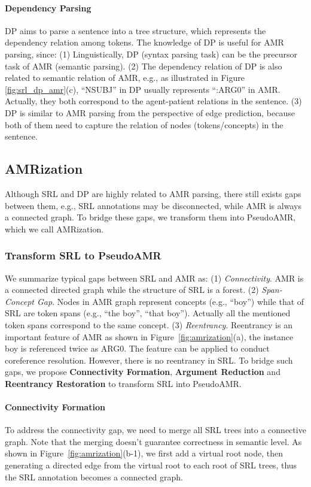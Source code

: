 \documentclass[11pt]{article}
\begin{document}
\paragraph{Dependency Parsing} DP aims to parse a sentence into a tree structure, which represents the dependency relation among tokens. 
The knowledge of DP is useful for AMR parsing, since:
(1) Linguistically, DP (syntax parsing task) can be the precursor task of AMR (semantic parsing).
(2) The dependency relation of DP is also related to semantic relation of AMR, e.g., as illustrated in Figure \ref{fig:srl_dp_amr}(c), ``NSUBJ'' in DP usually represents ``:ARG0'' in AMR. Actually, they both correspond to the agent-patient relations in the sentence.
(3) DP is similar to AMR parsing from the perspective of edge prediction, because both of them need to capture the relation of nodes (tokens/concepts) in the sentence.


\subsection{AMRization}

\label{sec: amrization}
Although SRL and DP are highly related to AMR parsing, there still exists gaps between them,
e.g., SRL annotations may be disconnected, while AMR is always a connected graph.
To bridge these gaps, we transform them into PseudoAMR, which we call AMRization.


\subsubsection{Transform SRL to PseudoAMR}
We summarize typical gaps between SRL and AMR as:
(1) \textit{Connectivity}. AMR is a connected directed graph while the structure of SRL is a forest. 
(2) \textit{Span-Concept Gap}. Nodes in AMR graph represent concepts (e.g., ``boy'') while that of SRL are token spans (e.g., ``the boy'', ``that boy''). Actually all the mentioned token spans correspond to the same concept.
(3) \textit{Reentrancy}. Reentrancy is an important feature of AMR as shown in Figure~\ref{fig:amrization}(a), the instance boy is referenced twice as ARG0. The feature can be applied to conduct coreference resolution. However, there is no reentrancy in SRL.
To bridge such gaps, we propose \textbf{Connectivity Formation}, \textbf{Argument Reduction}   and \textbf{Reentrancy Restoration} to transform SRL into PseudoAMR. 

\paragraph{Connectivity Formation}
\label{sec:graph formalization} 
To address the connectivity gap, we need to merge all SRL trees into a connective graph. Note that the merging doesn't guarantee correctness in semantic level. As shown in Figure~\ref{fig:amrization}(b-1), we first add a virtual root node, then generating a directed edge from the virtual root to each root of SRL trees, thus the SRL annotation becomes a connected graph. 
\end{document}
